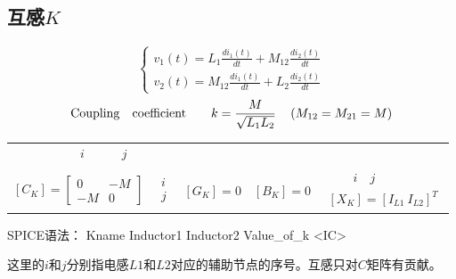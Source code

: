 \documentclass[12pt]{article}
\begin{document}
\subsection{互感$K$} \label{subsec:2.4}
\begin{equation*}
  \left\{\begin{array}{l}
  v_1(t)=L_1 \frac{d i_1(t)}{d t}+M_{12} \frac{d i_2(t)}{d t} \\
  v_2(t)=M_{12} \frac{d i_1(t)}{d t}+L_2 \frac{d i_2(t)}{d t}
  \end{array}\right.
\end{equation*}
\begin{equation*}
  {\rm Coupling \quad coefficient} \qquad  k=\frac{M}{\sqrt{L_1 L_2}} \quad\left(M_{12}=M_{21}=M\right)
\end{equation*}
\begin{table}[H]
  \centering
  \renewcommand\arraystretch{0.5}
  \begin{tabular}{ccccc}
  $ \qquad \qquad i \qquad \quad  j$ &  & & & \\                            \\
  $\left[C_K\right]=  \left[\begin{array}{cc} 0 & -M \\ -M & 0 \end{array}\right]$  & 
  $\begin{array}{c} i \\ j \end{array}$& 
  $\left[G_K\right]=0$ & 
  $\left[B_K\right]=0$ & 
  $\begin{array}{c} \qquad i \quad j \\ \left[X_K\right]=\left[ I_{L1} \ I_{L2} \right]^T\end{array}$ \\
  \end{tabular}
\end{table}
\qquad SPICE语法： Kname Inductor1 Inductor2 Value\_of\_k <IC>\par
\qquad 这里的$i$和$j$分别指电感$L1$和$L2$对应的辅助节点的序号。互感只对$C$矩阵有贡献。\par
\end{document}
